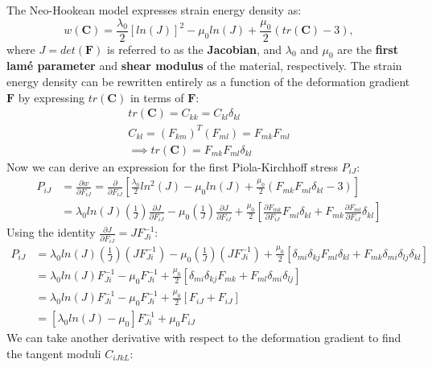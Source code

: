 \documentclass[]{spie}  %
\begin{document}
The Neo-Hookean model expresses strain energy density as:
\begin{equation}
\label{eq: strain energy density}
w(\bm{C}) = \frac{\lambda_0}{2}[ln(J)]^2 - \mu_0 ln(J) + \frac{\mu_0}{2}(tr(\bm{C}) - 3),
\end{equation}
where $J = det(\bm{F})$ is referred to as the \textbf{Jacobian}, and $\lambda_0$ and $\mu_0$ are the \textbf{first lam\'e parameter} and \textbf{shear modulus} of the material, respectively. The strain energy density can be rewritten entirely as a function of the deformation gradient $\bm{F}$ by expressing $tr(\bm{C})$ in terms of $\bm{F}$:
\begin{gather*}
tr(\bm{C}) = C_{kk} = C_{kl}\delta_{kl} \\
C_{kl} = (F_{km})^T(F_{ml}) = F_{mk}F_{ml} \\
\implies tr(\bm{C}) = F_{mk}F_{ml}\delta_{kl}
\end{gather*}
Now we can derive an expression for the first Piola-Kirchhoff stress $P_{iJ}$:
\begin{align}
P_{iJ} 	&= \frac{\partial w}{\partial F_{iJ}} = \frac{\partial}{\partial F_{iJ}} \left[\frac{\lambda_0}{2}ln^2(J) - \mu_0 ln(J) + \frac{\mu_0}{2}(F_{mk}F_{ml}\delta_{kl} - 3)\right] \\
&= \lambda_0 ln(J) \left(\frac{1}{J}\right) \frac{\partial J}{\partial F_{iJ}} - \mu_0 \left(\frac{1}{J}\right) \frac{\partial J}{\partial F_{iJ}} + \frac{\mu_0}{2} \left[\frac{\partial F_{mk}}{\partial F_{iJ}} F_{ml} \delta_{kl} + F_{mk} \frac{\partial F_{ml}}{\partial F_{iJ}} \delta_{kl}\right]
\end{align}
Using the identity $\frac{\partial J}{\partial F_{iJ}} = J F^{-1}_{Ji}$:
\begin{align}
P_{iJ} 	&= \lambda_0 ln(J) \left(\frac{1}{J}\right) (J F^{-1}_{Ji}) - \mu_0 \left(\frac{1}{J}\right) (J F^{-1}_{Ji}) + \frac{\mu_0}{2} \left[\delta_{mi}\delta_{kj} F_{ml} \delta_{kl} + F_{mk} \delta_{mi}\delta_{lj} \delta_{kl}\right] \\
&= \lambda_0 ln(J) F^{-1}_{Ji} - \mu_0 F^{-1}_{Ji} + \frac{\mu_0}{2} \left[\delta_{mi}\delta_{kj} F_{mk} + F_{ml} \delta_{mi}\delta_{lj}\right] \\
&= \lambda_0 ln(J) F^{-1}_{Ji} - \mu_0 F^{-1}_{Ji} + \frac{\mu_0}{2} \left[F_{iJ} + F_{iJ}\right] \\
&= \left[\lambda_0 ln(J) - \mu_0 \right]F^{-1}_{Ji} + \mu_0 F_{iJ}
\end{align}
We can take another derivative with respect to the deformation gradient to find the tangent moduli $C_{iJkL}$:
\end{document}

